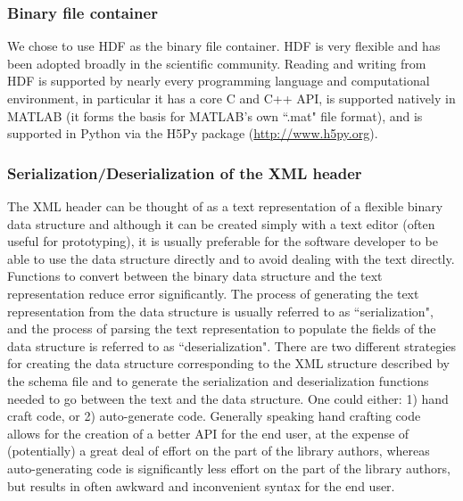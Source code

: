 \documentclass[12pt]{article}
\begin{document}
\subsubsection*{Binary file container}
We chose to use HDF as the binary file container.  HDF is very flexible and has been adopted broadly in the scientific community.  Reading and writing from HDF is supported by nearly every programming language and computational environment, in particular it has a core C and C++ API, is supported natively in MATLAB (it forms the basis for MATLAB's own ``.mat" file format), and is supported in Python via the H5Py package (\url{http://www.h5py.org}).

\subsubsection*{Serialization/Deserialization of the XML header}
The XML header can be thought of as a text representation of a flexible binary data structure and although it can be created simply with a text editor (often useful for prototyping), it is usually preferable for the software developer to be able to use the data structure directly and to avoid dealing with the text directly.  Functions to convert between the binary data structure and the text representation reduce error significantly.  The process of generating the text representation from the data structure is usually referred to as ``serialization", and the process of parsing the text representation to populate the fields of the data structure is referred to as ``deserialization".  There are two different strategies for creating the data structure corresponding to the XML structure described by the schema file and to generate the serialization and deserialization functions needed to go between the text and the data structure. One could either: 1) hand craft code, or 2) auto-generate code.  Generally speaking hand crafting code allows for the creation of a better API for the end user, at the expense of (potentially) a great deal of effort on the part of the library authors, whereas auto-generating code is significantly less effort on the part of the library authors, but results in often awkward and inconvenient syntax for the end user. 
\end{document}
